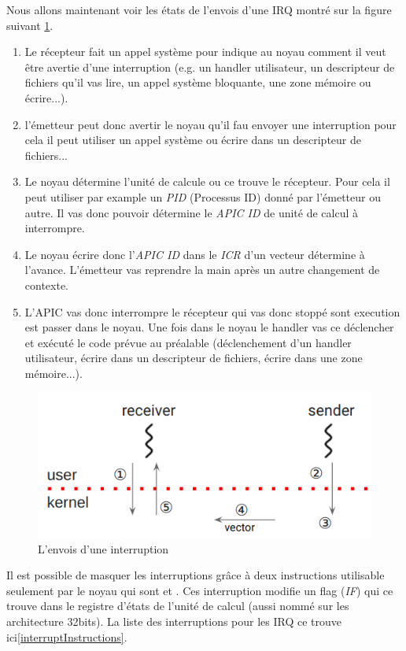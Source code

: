 Nous allons maintenant voir les états de l'envois d'une IRQ montré sur la figure suivant \ref{fig:sendInt}.

\begin{enumerate}[label=\protect\circled{\arabic*}]
  \item Le récepteur fait un appel système pour indique au noyau comment il veut être avertie d'une interruption (e.g. un handler utilisateur, un descripteur de fichiers qu'il vas lire, un appel système bloquante, une zone mémoire ou écrire...).
  \item l'émetteur peut donc avertir le noyau qu'il fau envoyer une interruption pour cela il peut utiliser un appel système ou écrire dans un descripteur de fichiers...
  \item Le noyau détermine l'unité de calcule ou ce trouve le récepteur. Pour cela il peut utiliser par example un \emph{PID} (Processus ID) donné par l'émetteur ou autre.
  Il vas donc pouvoir détermine le \emph{APIC ID} de unité de calcul à interrompre.
  \item Le noyau écrire donc l'\emph{APIC ID} dans le \emph{ICR} d'un vecteur détermine à l'avance. L'émetteur vas reprendre la main après un autre changement de contexte.
  \item L'APIC vas donc interrompre le récepteur qui vas donc stoppé sont execution est passer dans le noyau.
  Une fois dans le noyau le handler vas ce déclencher et exécuté le code prévue au préalable (déclenchement d'un handler utilisateur, écrire dans un descripteur de fichiers, écrire dans une zone mémoire...).
\end{enumerate}

\begin{figure}[H]
  \includegraphics[width=\textwidth]{images/interruptSend.png}
  \caption{L'envois d'une interruption}
  \label{fig:sendInt}
\end{figure}

Il est possible de masquer les interruptions grâce à deux instructions utilisable seulement par le noyau qui sont  et .
Ces interruption modifie un flag (\emph{IF}) qui ce trouve dans le registre d'états de l'unité de calcul  (aussi nommé  sur les architecture 32bits).
La liste des interruptions pour les IRQ ce trouve ici\ref{interruptInstructions}.

